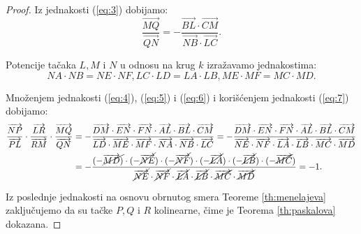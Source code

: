 \documentclass[a4paper,12pt]{article}
\theoremstyle{definition}
\begin{document}
\begin{proof}
\noindent Iz jednakosti (\ref{eq:3}) dobijamo:
\begin{equation}
\label{eq:6}
    \frac{\overrightarrow{MQ}}{\overrightarrow{QN}}=-\frac{{\overrightarrow{BL}}\cdot{\overrightarrow{CM}}}{{\overrightarrow{NB}\cdot{\overrightarrow{LC}}}}.
\end{equation}

\noindent{}Potencije ta\v{c}aka $L,M$ i $N$ u odnosu na krug $k$ izra\v{z}avamo jednakostima:
\begin{equation}
\label{eq:7}
    NA\cdot NB=NE\cdot NF, LC\cdot LD=LA \cdot LB, ME\cdot MF=MC \cdot MD.
\end{equation}

\noindent{}Mno\v{z}enjem jednakosti (\ref{eq:4}), (\ref{eq:5}) i (\ref{eq:6}) i kori\v{s}\'{c}enjem jednakosti (\ref{eq:7}) dobijamo:
\begin{align*}
	  \frac{\overrightarrow{NP}}{\overrightarrow{PL}}\cdot\frac{\overrightarrow{LR}}{\overrightarrow{RM}} \cdot \frac{\overrightarrow{MQ}}{\overrightarrow{QN}} &=
    -\frac{{\overrightarrow{DM}}\cdot {\overrightarrow{EN}}\cdot {\overrightarrow{FN}}\cdot {\overrightarrow{AL}}\cdot {\overrightarrow{BL}} \cdot {\overrightarrow{CM}}}{{\overrightarrow{LD}}\cdot {\overrightarrow{ME}}\cdot {\overrightarrow{MF}}\cdot {\overrightarrow{NA}}\cdot {\overrightarrow{NB}} \cdot {\overrightarrow{LC}}}=-\frac{{\overrightarrow{DM}}\cdot {\overrightarrow{EN}}\cdot {\overrightarrow{FN}}\cdot {\overrightarrow{AL}}\cdot {\overrightarrow{BL}} \cdot {\overrightarrow{CM}}}{{\overrightarrow{NE}}\cdot {\overrightarrow{NF}}\cdot {\overrightarrow{LA}}\cdot {\overrightarrow{LB}}\cdot {\overrightarrow{MC}} \cdot {\overrightarrow{MD}}}\\ &= -\frac{(-\cancel{{\overrightarrow{MD}})}\cdot {(-\cancel{\overrightarrow{NE}})}\cdot {(-\cancel{\overrightarrow{NF}})}\cdot {(-\cancel{\overrightarrow{LA}})}\cdot {(-\cancel{\overrightarrow{LB}})} \cdot {(-\cancel{\overrightarrow{MC}})}}{{\cancel{\overrightarrow{NE}}}\cdot {\cancel{\overrightarrow{NF}}}\cdot {\cancel{\overrightarrow{LA}}}\cdot {\cancel{\overrightarrow{LB}}}\cdot {\cancel{\overrightarrow{MC}}} \cdot {\cancel{\overrightarrow{MD}}}} = -1.
\end{align*}

\noindent{}Iz poslednje jednakosti na osnovu obrnutog smera Teoreme \ref{th:menelajeva} zaklju\v{c}ujemo da su ta\v{c}ke $P,Q$ i $R$ kolinearne, \v{c}ime je Teorema \ref{th:paskalova} dokazana.

\end{proof}
\end{document}
